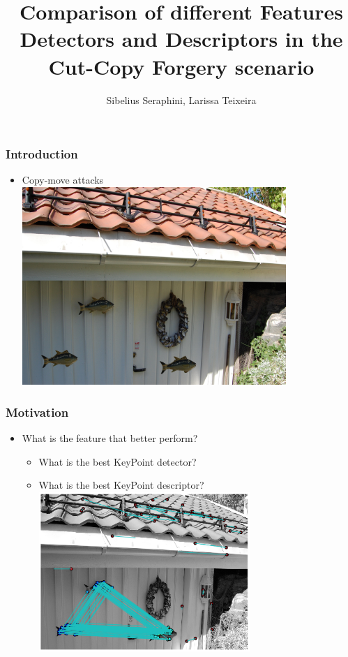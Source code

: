 \documentclass{beamer}
\title[Features]{Comparison of different Features Detectors and Descriptors in the Cut-Copy Forgery scenario}
\institute[CSI 445]{
    CSI 445 - Digital Image Forensics
}
\author[Seraphini,Teixeira]{Sibelius Seraphini, Larissa Teixeira}
\date{}
\begin{document}
    \frame{\titlepage}

    \begin{frame}
        \frametitle{Introduction}
        \begin{itemize}[<+->]
            \item Copy-move attacks
            \includegraphics[width=10cm]{tamp}
        \end{itemize}
    \end{frame}

    \begin{frame}
        \frametitle{Motivation}
        \begin{itemize}
            \item What is the feature that better perform?
            	\begin{itemize}
                    \item What is the best KeyPoint detector?
                    \item What is the best KeyPoint descriptor?
                    \includegraphics[width=8cm]{detected}
                \end{itemize}
        \end{itemize}
    \end{frame}
\end{document}
